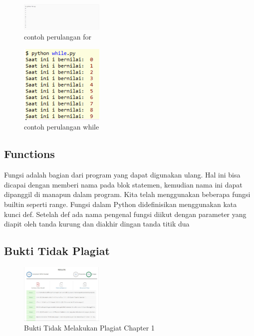 	\begin{figure}[H]
		\centering
		\includegraphics[width=4cm]{figures/kelompok1/1/damara/o_for.PNG}
		\caption{contoh perulangan for}
	\end{figure}

	\begin{figure}[H]
		\centering
		\includegraphics[width=4cm]{figures/kelompok1/1/damara/o_while.PNG}
		\caption{contoh perulangan while}
	\end{figure}

\subsection{Functions}
Fungsi adalah bagian dari program yang dapat digunakan ulang. Hal ini bisa dicapai dengan memberi nama pada blok statemen, kemudian nama ini dapat dipanggil di manapun dalam program. Kita telah menggunakan beberapa fungsi builtin seperti range.
Fungsi dalam Python didefinisikan menggunakan kata kunci def. Setelah def ada nama pengenal fungsi diikut dengan parameter yang diapit oleh tanda kurung dan diakhir dingan tanda titik dua 
\hfill\break

\hfill\break
\subsection{Bukti Tidak Plagiat}
\begin{figure}[H]
\centering
	\includegraphics[width=4cm]{figures/kelompok1/1/damara/plagiat.jpeg}
	\caption{Bukti Tidak Melakukan Plagiat Chapter 1}
\end{figure}

